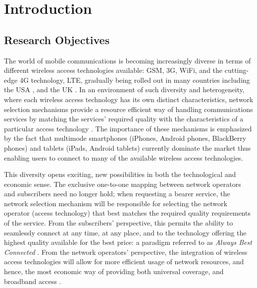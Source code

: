 \chapter{Introduction} %
\label{cha:introduction}

\minitoc
\vspace{10mm}

\section{Research Objectives} %
\label{sec:research_objectives_introduction}
The world of mobile communications is becoming increasingly diverse in terms of different wireless access technologies available: GSM, 3G, WiFi, and the cutting-edge 4G technology, LTE, gradually being rolled out in many countries including the USA \cite{VerizonLTEUSA}, and the UK \cite{BBCLTEUK}. In an environment of such diversity and heterogeneity, where each wireless access technology has its own distinct characteristics, network selection mechanisms provide a resource efficient way of handling communications services by matching the services' required quality with the characteristics of a particular access technology \cite{HossainBeaubrun09}. The importance of these mechanisms is emphasized by the fact that multimode smartphones (iPhones, Android phones, BlackBerry phones) and tablets (iPads, Android tablets) currently dominate the market thus enabling users to connect to many of the available wireless access technologies.

This diversity opens exciting, new possibilities in both the technological and economic sense. The exclusive one-to-one mapping between network operators and subscribers need no longer hold; when requesting a bearer service, the network selection mechanism will be responsible for selecting the network operator (access technology) that best matches the required quality requirements of the service. From the subscribers' perspective, this permits the ability to seamlessly connect at any time, at any place, and to the technology offering the highest quality available for the best price: a paradigm referred to as \emph{Always Best Connected} \cite{ABC03}. From the network operators' perspective, the integration of wireless access technologies will allow for more efficient usage of network resources, and hence, the most economic way of providing both universal coverage, and broadband access \cite{HossainBeaubrun09}.

